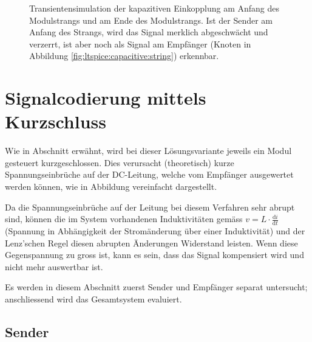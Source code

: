 \begin{figure}[h!tb]
    
    \caption[Simulationsergebnisse kapazitive Einkopplung, Modulstrang]{%
        Transientensimulation  der  kapazitiven   Einkopplung  am  Anfang  des
        Modulstrangs und  am Ende des  Modulstrangs. Ist der Sender  am Anfang
        des Strangs, wird das Signal merklich abgeschw\"acht und verzerrt, ist
        aber  noch  als  Signal  am  Empf\"anger  (Knoten    in
        Abbildung \ref{fig:ltspice:capacitive:string}) erkennbar.%
    }
    \label{fig:simu:capacitive:tran}
\end{figure}


\clearpage
\section{Signalcodierung mittels Kurzschluss}
\label{sec:simu:short}

Wie in Abschnitt  erw\"ahnt, wird bei dieser L\"osungsvariante
jeweils  ein Modul  gesteuert  kurzgeschlossen. Dies verursacht  (theoretisch)
kurze  Spannungseinbr\"uche   auf  der  DC-Leitung,  welche   vom  Empf\"anger
ausgewertet  werden  k\"onnen,  wie in  Abbildung  vereinfacht
dargestellt.

Da die Spannungseinbr\"uche  auf der Leitung bei diesem  Verfahren sehr abrupt
sind,  k\"onnen  die im  System  vorhandenen  Induktivit\"aten gem\"ass  $v  =
L  \cdot  \frac{\mathrm{d}i}{\mathrm{d}t}$  (Spannung  in  Abh\"angigkeit  der
Strom\"anderung \"uber  einer Induktivit\"at) und der  Lenz'schen Regel diesen
abrupten \"Anderungen  Widerstand leisten. Wenn  diese Gegenspannung  zu gross
ist, kann es sein, dass das  Signal kompensiert wird und nicht mehr auswertbar
ist.

Es  werden  in   diesem  Abschnitt  zuerst  Sender   und  Empf\"anger  separat
untersucht; anschliessend wird das Gesamtsystem evaluiert.


\subsection{Sender}
\label{subsec:simu:ask:sensor}

